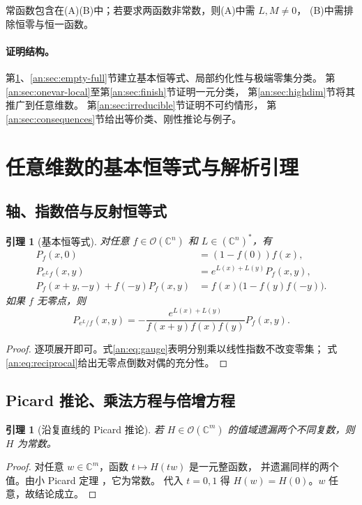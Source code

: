 \documentclass[11pt,a4paper,oneside,openany]{book}
\theoremstyle{lecture}
\newtheorem{lemma}[theorem]{引理}
\newcommand{\C}{\mathbb C}
\newcommand{\OO}{\mathcal O}
\numberwithin{equation}{section}
\begin{document}
常函数包含在(A)(B)中；若要求两函数非常数，则(A)中需 $L,M\ne0$，
(B)中需排除恒零与恒一函数。

\paragraph{证明结构。}
第\ref{an:sec:basic}、\ref{an:sec:empty-full}节建立基本恒等式、局部约化性与极端零集分类。
第\ref{an:sec:onevar-local}至第\ref{an:sec:finish}节证明一元分类，
第\ref{an:sec:highdim}节将其推广到任意维数。
第\ref{an:sec:irreducible}节证明不可约情形，
第\ref{an:sec:consequences}节给出等价类、刚性推论与例子。





\section{任意维数的基本恒等式与解析引理}\label{an:sec:basic}
\subsection{轴、指数倍与反射恒等式}
\begin{lemma}[基本恒等式]\label{an:lem:identities}
对任意 $f\in\OO(\C^n)$ 和 $L\in(\C^n)^*$，有
\begin{align}
 P_f(x,0)&=(1-f(0))f(x),\label{an:eq:axis}\\
 P_{e^Lf}(x,y)&=e^{L(x)+L(y)}P_f(x,y),\label{an:eq:gauge}\\
 P_f(x+y,-y)+f(-y)P_f(x,y)
 &=f(x)\bigl(1-f(y)f(-y)\bigr).\label{an:eq:reflection}
\end{align}
如果 $f$ 无零点，则
\begin{equation}\label{an:eq:reciprocal}
 P_{e^L/f}(x,y)
 =-\frac{e^{L(x)+L(y)}}{f(x+y)f(x)f(y)}P_f(x,y).
\end{equation}
\end{lemma}
\begin{proof}
逐项展开即可。式\eqref{an:eq:gauge}表明分别乘以线性指数不改变零集；
式\eqref{an:eq:reciprocal}给出无零点倒数对偶的充分性。
\end{proof}

\subsection{Picard 推论、乘法方程与倍增方程}
\begin{lemma}[沿复直线的 Picard 推论]\label{an:lem:picard}
若 $H\in\OO(\C^m)$ 的值域遗漏两个不同复数，则 $H$ 为常数。
\end{lemma}
\begin{proof}
对任意 $w\in\C^m$，函数 $t\mapsto H(tw)$ 是一元整函数，
并遗漏同样的两个值。由小 Picard 定理
\cite{vojta}，它为常数。
代入 $t=0,1$ 得 $H(w)=H(0)$。$w$ 任意，故结论成立。
\end{proof}
\end{document}
